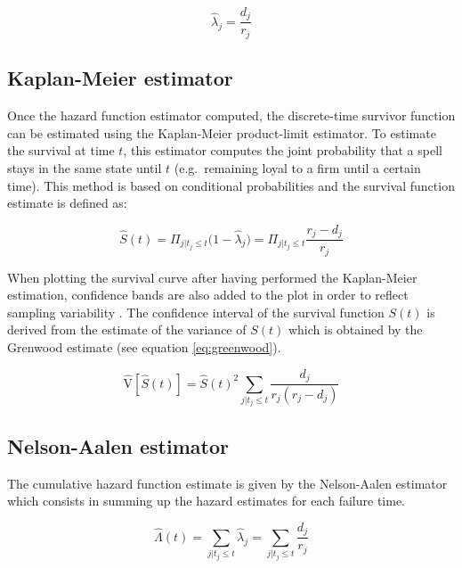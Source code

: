 \documentclass[
]{book}
\begin{document}
\begin{equation}
  \hat{\lambda}_j = \frac{d_j}{r_j}
  \label{eq:hazest}
\end{equation}

\hypertarget{kaplan-meier-estimator}{%
\subsection{Kaplan-Meier estimator}\label{kaplan-meier-estimator}}

Once the hazard function estimator computed, the discrete-time survivor function can be estimated using the Kaplan-Meier product-limit estimator. To estimate the survival at time \(t\), this estimator computes the joint probability that a spell stays in the same state until \(t\) (e.g.~remaining loyal to a firm until a certain time). This method is based on conditional probabilities and the survival function estimate is defined as:

\begin{equation}
  \hat{S}(t) = \Pi_{j|t_j \leq t} \big(1-\hat{\lambda}_j\big) = \Pi_{j|t_j \leq t}\frac{r_j - d_j}{r_j}
  \label{eq:kaplanmeier}
\end{equation}

When plotting the survival curve after having performed the Kaplan-Meier estimation, confidence bands are also added to the plot in order to reflect sampling variability \citep{CAMERON_TRIVEDI}. The confidence interval of the survival function \(S(t)\) is derived from the estimate of the variance of \(S(t)\) which is obtained by the Grenwood estimate (see equation \eqref{eq:greenwood}).

\begin{equation}
  \hat{\mathrm{V}}[\hat{S}(t)] = \hat{S}(t)^2 \sum_{j|t_j \leq t} \frac{d_j}{r_j(r_j-d_j)}
  \label{eq:greenwood}
\end{equation}

\hypertarget{nelson-aalen-estimator}{%
\subsection{Nelson-Aalen estimator}\label{nelson-aalen-estimator}}

The cumulative hazard function estimate is given by the Nelson-Aalen estimator which consists in summing up the hazard estimates for each failure time.

\begin{equation}
  \hat{\Lambda}(t) = \sum_{j | t_j \leq t} \hat{\lambda}_{j} = \sum_{j | t_j \leq t} \frac{d_j}{r_j}
  \label{eq:nelsonaalen}
\end{equation}
\end{document}
